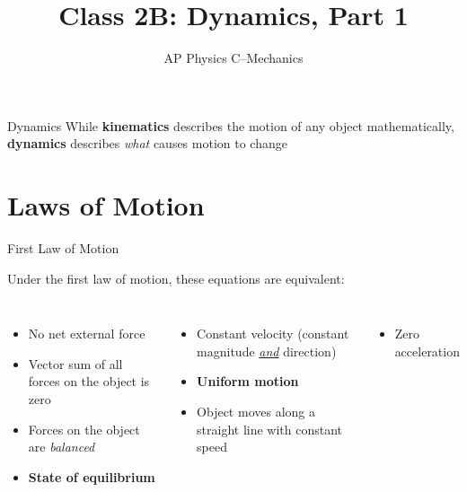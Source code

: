 \documentclass[12pt,compress,aspectratio=169]{beamer}
\title{Class 2B: Dynamics, Part 1}
\subtitle{AP Physics C--Mechanics}
\begin{document}
\begin{frame}
  \maketitle
\end{frame}



\begin{frame}{Dynamics}
  While \textbf{kinematics} describes the motion of any object mathematically,
  \textbf{dynamics} describes \emph{what} causes motion to change
\end{frame}



\section{Laws of Motion}

\begin{frame}{First Law of Motion}
  \begin{center}
  \end{center}
  Under the first law of motion, these equations are equivalent:
  

  \vspace{-.15in}
  \begin{columns}[T]
    \begin{itemize}
    \item No net external force
    \item Vector sum of all forces on the object is zero
    \item Forces on the object are \emph{balanced}
    \item\textbf{State of equilibrium}
    \end{itemize}
    
    \begin{itemize}
    \item Constant velocity (constant magnitude \underline{\emph{and}}
      direction)
    \item\textbf{Uniform motion}
    \item Object moves along a straight line with constant speed
    \end{itemize}
    
    \begin{itemize}
    \item Zero acceleration
    \end{itemize}
  \end{columns}
\end{frame}
\end{document}
